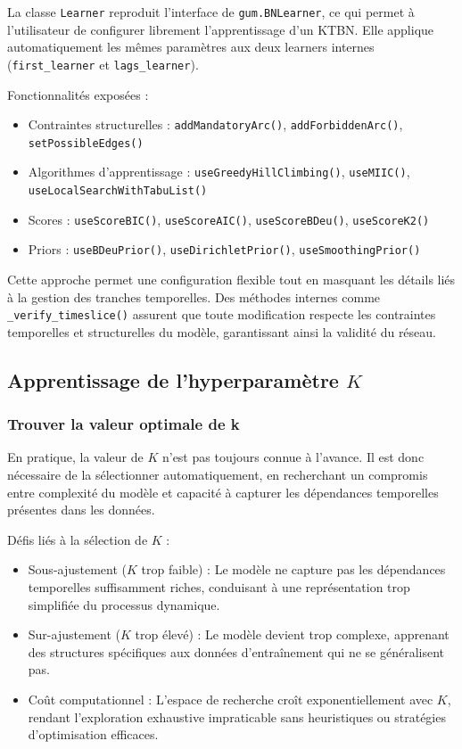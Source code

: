 \documentclass{article}
\begin{document}
La classe \texttt{Learner} reproduit l'interface de \texttt{gum.BNLearner}, ce qui permet à l'utilisateur de
configurer librement l'apprentissage d'un KTBN. Elle applique automatiquement les mêmes paramètres aux deux
learners internes (\texttt{first\_learner} et \texttt{lags\_learner}).

Fonctionnalités exposées :
\begin{itemize}
    \item Contraintes structurelles : \texttt{addMandatoryArc()}, \texttt{addForbiddenArc()}, \texttt{setPossibleEdges()}
    \item Algorithmes d'apprentissage : \texttt{useGreedyHillClimbing()}, \texttt{useMIIC()}, \texttt{useLocalSearchWithTabuList()}
    \item Scores : \texttt{useScoreBIC()}, \texttt{useScoreAIC()}, \texttt{useScoreBDeu()}, \texttt{useScoreK2()}
    \item Priors : \texttt{useBDeuPrior()}, \texttt{useDirichletPrior()}, \texttt{useSmoothingPrior()}
\end{itemize}

Cette approche permet une configuration flexible tout en masquant les détails liés à la gestion des tranches temporelles.
Des méthodes internes comme \texttt{\_verify\_timeslice()} assurent que toute modification respecte les contraintes
temporelles et structurelles du modèle, garantissant ainsi la validité du réseau.


\subsection{Apprentissage de l'hyperparamètre $K$}

\subsubsection{Trouver la valeur optimale de k}

En pratique, la valeur de $K$ n'est pas toujours connue à l'avance. Il est donc nécessaire de la sélectionner
automatiquement, en recherchant un compromis entre complexité du modèle et capacité à capturer les dépendances
temporelles présentes dans les données.

Défis liés à la sélection de $K$ :

\begin{itemize}
    \item Sous-ajustement ($K$ trop faible) : Le modèle ne capture pas les dépendances temporelles suffisamment
          riches, conduisant à une représentation trop simplifiée du processus dynamique.
    \item Sur-ajustement ($K$ trop élevé) : Le modèle devient trop complexe, apprenant des structures spécifiques
          aux données d'entraînement qui ne se généralisent pas.
    \item Coût computationnel : L'espace de recherche croît exponentiellement avec $K$, rendant l'exploration
          exhaustive impraticable sans heuristiques ou stratégies d'optimisation efficaces.
\end{itemize}
\end{document}
